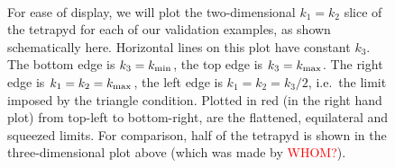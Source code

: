 \begin{figure}[!pth]
\centering
    \\
\caption{
    For ease of display, we will plot the two-dimensional $k_1=k_2$ slice of the tetrapyd
    for each of our validation examples, as shown schematically here.
    Horizontal lines on this plot have
    constant $k_3$. The bottom edge is $k_3={k_\text{min}}$, the top
    edge is $k_3={k_\text{max}}$. The right edge is $k_1=k_2={k_\text{max}}$, the
    left edge is $k_1=k_2=k_3/2$, i.e.\ the limit imposed by the triangle condition.
    Plotted in red (in the right hand plot) from top-left to bottom-right,
    are the flattened, equilateral and squeezed limits. For comparison,
    half of the tetrapyd is shown in the three-dimensional plot above
    (which was made by \textcolor{red}{WHOM?}).
}\label{slice_explained}
\end{figure}


